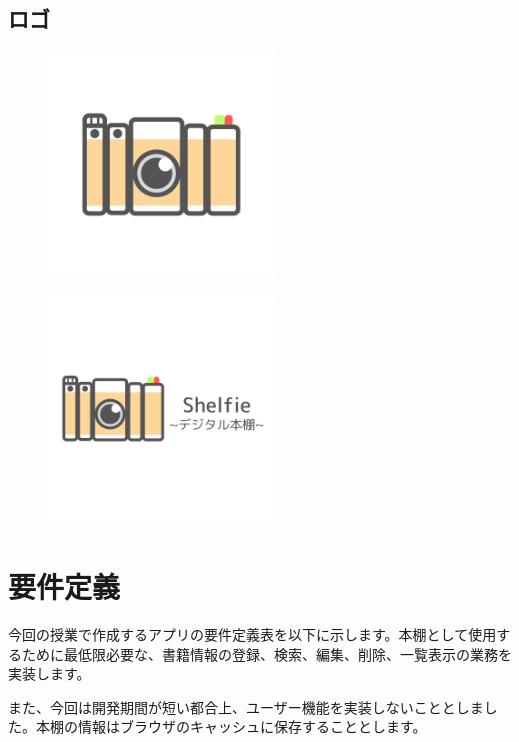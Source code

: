 \documentclass[a4paper, 11pt, titlepage]{jsarticle}
\begin{document}
\clearpage

\subsection{ロゴ}
\begin{figure}[htbp]
\centering
\includegraphics[width=60mm] {shelfie_logo.png}
\label{fig:func}
\end{figure}

\begin{figure}[htbp]
\centering
\includegraphics[width=60mm] {shelfie_logo2.png}
\label{fig:func}
\end{figure}
\clearpage
\section{要件定義}
今回の授業で作成するアプリの要件定義表を以下に示します。本棚として使用するために最低限必要な、書籍情報の登録、検索、編集、削除、一覧表示の業務を実装します。

また、今回は開発期間が短い都合上、ユーザー機能を実装しないこととしました。本棚の情報はブラウザのキャッシュに保存することとします。
\end{document}

